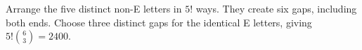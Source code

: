 Arrange the five distinct non-E letters in $5!$ ways. They create six gaps, including both ends. Choose three distinct gaps for the identical E letters, giving $5!\binom63=\boxed{2400}$.
